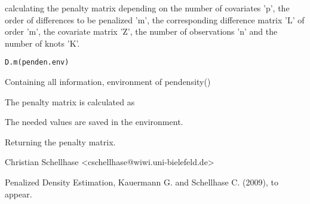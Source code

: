 \begin{Description}\relax
calculating the penalty matrix depending on the number of covariates 'p', the order of differences to be penalized 'm', the corresponding difference matrix 'L' of order 'm', the covariate matrix 'Z', the number of observations 'n' and the number of knots 'K'.
\end{Description}
\begin{Usage}
\begin{verbatim}
D.m(penden.env)
\end{verbatim}
\end{Usage}
\begin{Arguments}
\begin{ldescription}
\item[\code{penden.env}] Containing all information, environment of pendensity()
\end{ldescription}
\end{Arguments}
\begin{Details}\relax
The penalty matrix is calculated as


The needed values are saved in the environment.
\end{Details}
\begin{Value}
Returning the penalty matrix.
\end{Value}
\begin{Author}\relax
Christian Schellhase <cschellhase@wiwi.uni-bielefeld.de>
\end{Author}
\begin{References}\relax
Penalized Density Estimation, Kauermann G. and Schellhase C. (2009), to appear.
\end{References}

